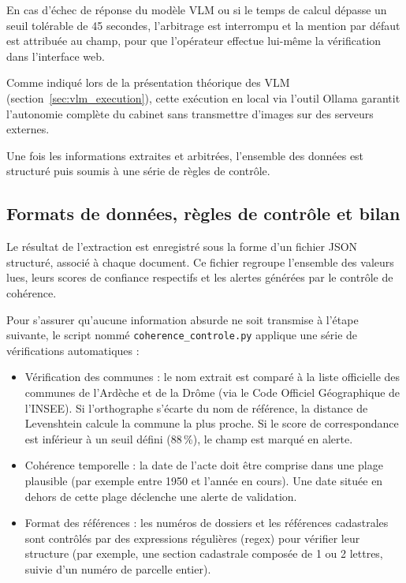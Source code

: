 En cas d'échec de réponse du modèle VLM ou si le temps de calcul dépasse un seuil tolérable de 45 secondes, l'arbitrage est interrompu et la mention par défaut est attribuée au champ, pour que l'opérateur effectue lui-même la vérification dans l'interface web.

Comme indiqué lors de la présentation théorique des VLM (section~\ref{sec:vlm_execution}), cette exécution en local via l'outil Ollama garantit l'autonomie complète du cabinet sans transmettre d'images sur des serveurs externes.

Une fois les informations extraites et arbitrées, l'ensemble des données est structuré puis soumis à une série de règles de contrôle.


\subsection{Formats de données, règles de contrôle et bilan}

Le résultat de l'extraction est enregistré sous la forme d'un fichier JSON structuré, associé à chaque document. Ce fichier regroupe l'ensemble des valeurs lues, leurs scores de confiance respectifs et les alertes générées par le contrôle de cohérence.

Pour s'assurer qu'aucune information absurde ne soit transmise à l'étape suivante, le script nommé 
\texttt{coherence\_controle.py} applique une série de vérifications automatiques :

\begin{itemize}
  \item Vérification des communes : le nom extrait est comparé à la liste officielle des communes de l'Ardèche et de la Drôme (via le Code Officiel Géographique de l'INSEE). Si l'orthographe s'écarte du nom de référence, la distance de Levenshtein calcule la commune la plus proche. Si le score de correspondance est inférieur à un seuil défini (88\,\%), le champ est marqué en alerte.
  \item Cohérence temporelle : la date de l'acte doit être comprise dans une plage plausible (par exemple entre 1950 et l'année en cours). Une date située en dehors de cette plage déclenche une alerte de validation.
  \item Format des références : les numéros de dossiers et les références cadastrales sont contrôlés par des expressions régulières (regex) pour vérifier leur structure (par exemple, une section cadastrale composée de 1 ou 2 lettres, suivie d'un numéro de parcelle entier).
\end{itemize}

